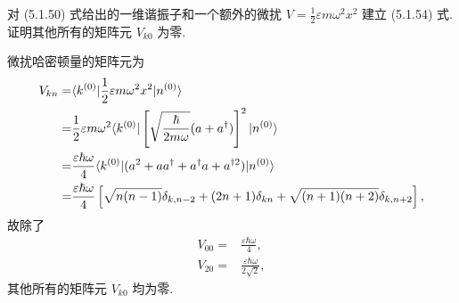 \documentclass{assignment}
\begin{document}
\begin{prob}[课本习题 5.5]
    对 (5.1.50) 式给出的一维谐振子和一个额外的微扰 $V=\frac{1}{2}\varepsilon m\omega^2x^2$ 建立 (5.1.54) 式. 证明其他所有的矩阵元 $V_{k0}$ 为零.
\end{prob}
\begin{pf}
    微扰哈密顿量的矩阵元为
    \begin{align}
        \notag V_{kn}=&\langle k^{(0)}\rvert\frac{1}{2}\varepsilon m\omega^2x^2\lvert n^{(0)}\rangle\\
        \notag=&\frac{1}{2}\varepsilon m\omega^2\langle k^{(0)}\rvert\left[\sqrt{\frac{\hbar}{2m\omega}}(a+a^{\dagger})\right]^2\lvert n^{(0)}\rangle\\
        \notag=&\frac{\varepsilon\hbar\omega}{4}\langle k^{(0)}\rvert(a^2+aa^{\dagger}+a^{\dagger}a+a^{\dagger 2})\lvert n^{(0)}\rangle\\\
        \notag=&\frac{\varepsilon\hbar\omega}{4}\left[\sqrt{n(n-1)}\delta_{k,n-2}+(2n+1)\delta_{kn}+\sqrt{(n+1)(n+2)}\delta_{k,n+2}\right],
    \end{align}
    故除了
    \begin{align}
        V_{00}=&\frac{\varepsilon\hbar\omega}{4},\\
        V_{20}=&\frac{\varepsilon\hbar\omega}{2\sqrt{2}},
    \end{align}
    其他所有的矩阵元 $V_{k0}$ 均为零.
\end{pf}
\end{document}

